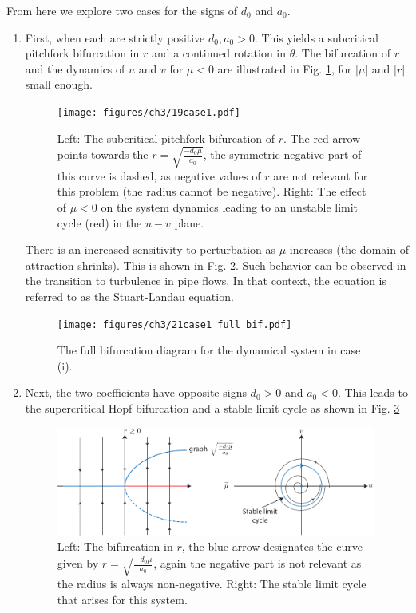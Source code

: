 From here we explore two cases for the signs of $d_0$ and $a_0$.
\begin{enumerate}
	\item First, when each are strictly positive $d_0, a_0 >0$. This yields a subcritical pitchfork bifurcation in $r$ and a continued rotation in $\theta $. The bifurcation of $r$ and the dynamics of $u$ and $v$ for $\mu < 0 $ are illustrated in Fig. \ref{fig:case1_hb}, for $|\mu |$ and $|r|$ small enough.
		\begin{figure}[h!]
			\centering
			\texttt{[image: figures/ch3/19case1.pdf]}
			\caption{Left: The subcritical pitchfork bifurcation of $r$. The red arrow points towards the $r = \sqrt{\frac{-d_0 \mu }{a_0}}$, the symmetric negative part of this curve is dashed, as negative values of $r$ are not relevant for this problem (the radius cannot be negative). Right: The effect of $\mu <0$ on the system dynamics leading to an unstable limit cycle (red) in the $u-v$ plane.}
			\label{fig:case1_hb}
		\end{figure}
		There is an increased sensitivity to perturbation as $\mu $ increases (the domain of attraction shrinks). This is shown in Fig. \ref{fig:case1_full_bif}. Such behavior can be observed in the transition to turbulence in pipe flows. In that context, the equation is referred to as the Stuart-Landau equation.
		\begin{figure}[h!]
			\centering
			\texttt{[image: figures/ch3/21case1\_full\_bif.pdf]}
			\caption{The full bifurcation diagram for the dynamical system in case (i).}
			\label{fig:case1_full_bif}
		\end{figure}
	\item Next, the two coefficients have opposite signs $d_0 > 0$ and $a_0 <0$. This leads to the supercritical Hopf bifurcation and a stable limit cycle as shown in Fig. \ref{fig:case2_bif}
		\begin{figure}[h!]
			\centering
			\includegraphics[width=0.99\textwidth]{figures/ch3/22case2_r_bif.pdf}
			\caption{Left: The bifurcation in $r$, the blue arrow designates the curve given by $r=\sqrt{\frac{-d_0 \mu }{a_0}}$, again the negative part is not relevant as the radius is always non-negative. Right: The stable limit cycle that arises for this system.}
			\label{fig:case2_bif}
		\end{figure}
	

\end{enumerate}
